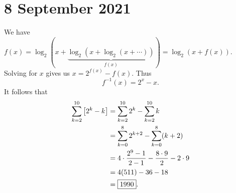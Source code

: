 \documentclass[letterpaper,oneside]{scrartcl}
\begin{document}
\section*{8 September 2021}
We have \(f(x)=\log_2(x+\underbrace{\log_2(x+\log_2(x+\cdots))}_{f(x)}) = \log_2(x+f(x))\). Solving for \(x\) gives us \(x=2^{f(x)}-f(x).\) Thus
\[f^{-1}(x)=2^x-x.\]
It follows that
\begin{align*}
    \sum_{k=2}^{10} \left[2^k-k\right] & = \sum_{k=2}^{10}2^k-\sum_{k=2}^{10}k               \\
                                       & = \sum_{k=0}^{8} 2^{k+2}-\sum_{k=0}^{8}(k+2)        \\
                                       & = 4\cdot\frac{2^9-1}{2-1}-\frac{8\cdot9}{2}-2\cdot9 \\
                                       & = 4(511)-36-18                                      \\
                                       & = \fbox{1990}.
\end{align*}
\end{document}
